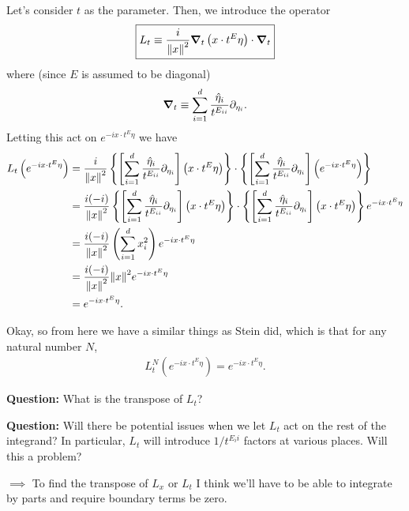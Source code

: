 \documentclass{article}
\theoremstyle{definition}
\newcommand{\p}{\partial}
\newcommand{\f}[2]{\frac{#1}{#2}}
\newcommand{\lp}{\left(}
\newcommand{\rp}{\right)}
\newcommand{\lb}{\left[}
\newcommand{\rb}{\right]}
\newcommand{\lc}{\left\{}
\newcommand{\rc}{\right\}}
\begin{document}
Let's consider $t$ as the parameter. Then, we introduce the operator
\begin{align*}
    \boxed{L_t \equiv \f{i}{\norm{x}^2}\grad_t \lp x \cdot t^E \eta \rp  \cdot \grad_t}
\end{align*}
where (since $E$ is assumed to be diagonal)
\begin{align*}
    \grad_t \equiv \sum^d_{i=1} \f{\hat\eta_i}{t^{E_{ii}}} \p_{\eta_i} .
\end{align*}
Letting this act on $e^{-i x \cdot t^E \eta}$ we have
\begin{align*}
    L_t \lp e^{-i x \cdot t^E \eta} \rp
    &= \f{i}{\norm{x}^2} \lc \lb \sum^d_{i=1} \f{\hat\eta_i}{t^{E_{ii}}} \p_{\eta_i} \rb \lp x\cdot t^E \eta \rp \rc \cdot \lc \lb \sum^d_{i=1} \f{\hat\eta_i}{t^{E_{ii}}} \p_{\eta_i} \rb  \lp e^{-i x\cdot t^E \eta} \rp \rc\\
    &=  \f{i(-i)}{\norm{x}^2} \lc \lb \sum^d_{i=1} \f{\hat\eta_i}{t^{E_{ii}}} \p_{\eta_i}  \rb \lp x\cdot t^E \eta \rp \rc \cdot \lc \lb \sum^d_{i=1} \f{\hat\eta_i}{t^{E_{ii}}} \p_{\eta_i} \rb \lp x\cdot t^E \eta \rp \rc e^{-i x\cdot t^E \eta}\\
    &= \f{i(-i)}{\norm{x}^2} \lp \sum^d_{i=1} x_i^2 \rp e^{-i x\cdot t^E \eta}\\
    &= \f{i(-i)}{\norm{x}^2} \norm{x}^2 e^{-i x\cdot t^E \eta}\\
    &= e^{-i x\cdot t^E \eta}.
\end{align*}


Okay, so from here we have a similar things as Stein did, which is that for any natural number $N$,
\begin{align*}
    L_t^N \lp e^{-i x\cdot t^E \eta} \rp = e^{-i x \cdot t^E \eta}.
\end{align*}



\begin{framed}
\noindent \textbf{Question:} What is the transpose of $L_t$?
\end{framed}

\begin{framed}
\noindent \textbf{Question:} Will there be potential issues when we let $L_t$ act on the rest of the integrand? In particular, $L_t$ will introduce $1/t^{E_ii}$ factors at various places. Will this a problem?
\end{framed}


$\implies $ To find the transpose of $L_x$ or $L_t$ I think we'll have to be able to integrate by parts and require boundary terms be zero. 
\end{document}
